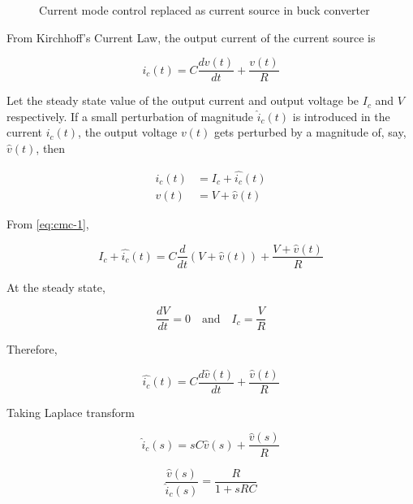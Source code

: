 \documentclass[a4paper]{IEEEtran}
\begin{document}
	\begin{figure}
		\centering
		
		\caption{Current mode control replaced as current source in buck converter}
		\label{fig:25}
	\end{figure}

	From Kirchhoff's Current Law, the output current of the current source is

	\begin{equation}
		i_c(t) = C\dfrac{dv(t)}{dt} + \dfrac{v(t)}{R}
		\label{eq:cmc-1}
	\end{equation}

	Let the steady state value of the output current and output voltage be $I_c$ and $V$ respectively. If a small perturbation of magnitude $\hat{i}_c(t)$ is introduced in the current $i_c(t)$, the output voltage $v(t)$ gets perturbed by a magnitude of, say, $\hat{v}(t)$, then

	\begin{align}
		i_c(t) &= I_c + \hat{i_c}(t)\\
		v(t) &= V + \hat{v}(t)
		\label{eq:cmc-2}
	\end{align}

	From \eqref{eq:cmc-1},

	\begin{equation}
		I_c + \hat{i_c}(t) = C\dfrac{d}{dt}(V + \hat{v}(t)) + \dfrac{V + \hat{v}(t)}{R}
		\label{eq:cmc-3}
	\end{equation}

	At the steady state, 

	\begin{equation}
		\dfrac{dV}{dt} = 0 \quad \text{and} \quad I_c = \dfrac{V}{R}
		\label{eq:cmc-4}
	\end{equation}

	Therefore,

	\begin{equation}
		\hat{i_c}(t) = C\dfrac{d\hat{v}(t)}{dt} + \dfrac{\hat{v}(t)}{R}
		\label{eq:cmc-5}
	\end{equation}

	Taking Laplace transform

	\begin{equation}
		\hat{i}_c(s) = sC\hat{v}(s) + \dfrac{\hat{v}(s)}{R}
	\end{equation}

	\begin{equation}
		\dfrac{\hat{v}(s)}{\hat{i}_c(s)} = \dfrac{R}{1+sRC}
	\end{equation}
\end{document}
